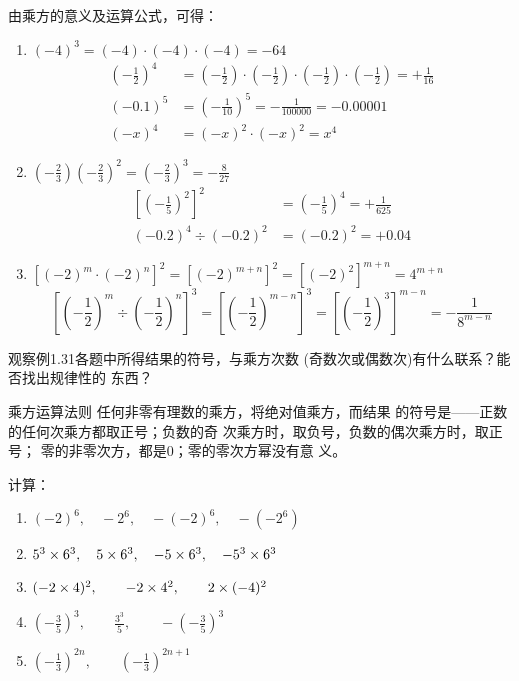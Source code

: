 \begin{solution}
    由乘方的意义及运算公式，可得：
 \begin{enumerate}
     \item $(-4)^3=(-4)\cdot (-4)\cdot (-4)=-64$
     \[\begin{split}
        \left(-\frac{1}{2}\right)^4&=\left(-\frac{1}{2}\right)\cdot\left(-\frac{1}{2}\right)\cdot\left(-\frac{1}{2}\right)\cdot\left(-\frac{1}{2}\right)=+\frac{1}{16}\\
        (-0.1)^5&=\left(-\frac{1}{10}\right)^5=-\frac{1}{100000}=-0.00001\\
        (-x)^4&=(-x)^2\cdot (-x)^2=x^4
     \end{split}\]
\item $\left(-\frac{2}{3}\right)\left(-\frac{2}{3}\right)^2=\left(-\frac{2}{3}\right)^3=-\frac{8}{27}$
\[\begin{split}
    \left[\left(-\frac{1}{5}\right)^2\right]^2&=\left(-\frac{1}{5}\right)^4=+\frac{1}{625}\\
    (-0.2)^4\div (-0.2)^2&=(-0.2)^2=+0.04
\end{split}\]
\item $\left[(-2)^m\cdot (-2)^n\right]^2=[(-2)^{m+n}]^2=[(-2)^2]^{m+n}=4^{m+n}$
\[\left[\left(-\frac{1}{2}\right)^m\div \left(-\frac{1}{2}\right)^n\right]^3=\left[\left(-\frac{1}{2}\right)^{m-n}\right]^3=\left[\left(-\frac{1}{2}\right)^3\right]^{m-n}=-\frac{1}{8^{m-n}}\]
 \end{enumerate}
\end{solution}

观察例1.31各题中所得结果的符号，与乘方次数
(奇数次或偶数次)有什么联系？能否找出规律性的
东西？
  
\begin{blk}{乘方运算法则}
    任何非零有理数的乘方，将绝对值乘方，而结果
的符号是——正数的任何次乘方都取正号；负数的奇
次乘方时，取负号，负数的偶次乘方时，取正号；
  零的非零次方，都是0；零的零次方幂没有意
义。
\end{blk}


\begin{example}
    计算：
\begin{enumerate}
    \item $(-2)^6,\quad -2^6,\quad -(-2)^6,\quad -(-2^6) $
    \item $5^3\times 6^3,\quad 5\times 6^3,\quad -5\times 6^3,\quad -5^3\times 6^3$
    \item $(-2\times 4)^2,\qquad -2\times 4^2,\qquad 2\times (-4)^2$
    \item $\left(-\frac{3}{5}\right)^3,\qquad \frac{3^3}{5},\qquad -\left(-\frac{3}{5}\right)^3$
    \item $\left(-\frac{1}{3}\right)^{2n},\qquad \left(-\frac{1}{3}\right)^{2n+1}$
\end{enumerate}
\end{example}

